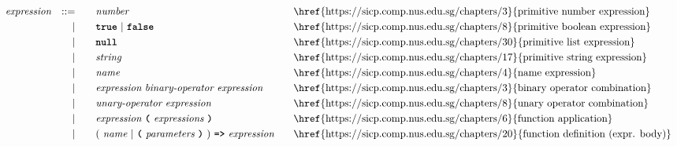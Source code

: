 \begin{alignat*}{9}
&& \textit{expression}   && ::= &\quad &&  \textit{number}   && \textrm{\href{https://sicp.comp.nus.edu.sg/chapters/3}{primitive number expression}}\\
&&                       && |   &\quad && \textbf{\texttt{true}}\ |\ \textbf{\texttt{false}}
                                                           && \textrm{\href{https://sicp.comp.nus.edu.sg/chapters/8}{primitive boolean expression}}\\
&&                       && |   &\quad && \textbf{\texttt{null}}
                                                           && \textrm{\href{https://sicp.comp.nus.edu.sg/chapters/30}{primitive list expression}} \\
&&                       && |   &\quad &&  \textit{string}   && \textrm{\href{https://sicp.comp.nus.edu.sg/chapters/17}{primitive string expression}} \\
&&                       && |   &\quad &&  \textit{name}   && \textrm{\href{https://sicp.comp.nus.edu.sg/chapters/4}{name expression}} \\
&&                       && |   &\quad &&  \textit{expression} \  \textit{binary-operator} \ 
                                            \textit{expression} \qquad
                                                           && \textrm{\href{https://sicp.comp.nus.edu.sg/chapters/3}{binary operator combination}} \\
&&                       && |   &\quad &&   \textit{unary-operator} \ 
                                            \textit{expression}
                                                           && \textrm{\href{https://sicp.comp.nus.edu.sg/chapters/8}{unary operator combination}}\\
&&                       && |   &\quad &&   \textit{expression} \ 
                                            \textbf{\texttt{(}}\ \textit{expressions}\
                                            \textbf{\texttt{)}}
                                                           && \textrm{\href{https://sicp.comp.nus.edu.sg/chapters/6}{function application}} \\
&&                       && |   &\quad &&   (\ \textit{name}\ | \
                                               \textbf{\texttt{(}}\ \textit{parameters}\ \textbf{\texttt{)}}\
                                            )\    
                                            \texttt{\textbf{=>}}\ \textit{expression}
                                                           && \textrm{\href{https://sicp.comp.nus.edu.sg/chapters/20}{function definition (expr. body)}} \\

\end{alignat*}
